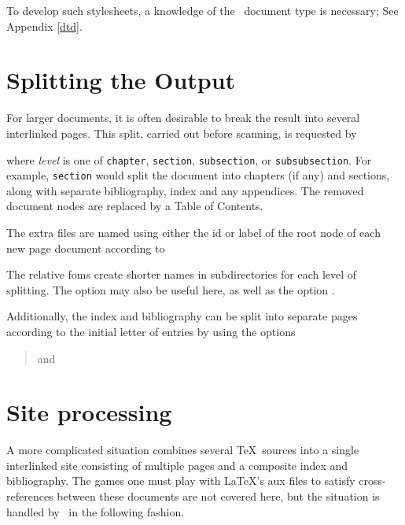 \documentclass{report}
\begin{document}
To develop such stylesheets, a knowledge
of the \LaTeXML\ document type is necessary; See Appendix \ref{dtd}.

\section[Splitting]{Splitting the Output}\label{usage.multiple}
For larger documents, it is often desirable to break the 
result into several interlinked pages. This split,
carried out before scanning, is requested by 
\begin{quote}
\end{quote}
where \textit{level} is one of \texttt{chapter},
\texttt{section}, \texttt{subsection}, or \texttt{subsubsection}.
For example, \texttt{section} would split the document into
chapters (if any) and sections, along with separate
bibliography, index and any appendices.
The removed document nodes are replaced by a Table of Contents.

The extra files are named using either the id or label
of the root node of each new page document according to
\begin{quote}
\end{quote}
The relative foms create shorter names in subdirectories for each
level of splitting.
The  option may also be useful here,
as well as the  option .

Additionally, the index and bibliography can be split
into separate pages according to the initial letter of entries by using the options
\begin{quote}
   and 
\end{quote}

\section[Sites]{Site processing}\label{usage.site}
A more complicated situation combines several \TeX\ sources
into a single interlinked site consisting of multiple pages
and a composite index and bibliography.
The games one must play with \LaTeX's aux files to satisfy cross-references
between these documents are not covered here, but the situation is handled
by \LaTeXML\ in the following fashion.
\end{document}
